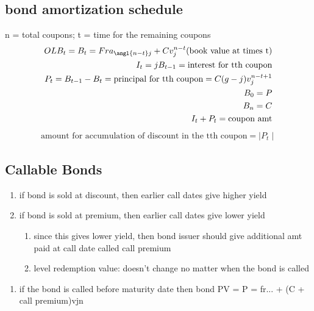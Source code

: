 \documentclass[12pt]{article}
\begin{document}
\subsection{bond amortization schedule}
n = total coupons; t = time for the remaining coupons
\begin{align}
	OLB_t = B_t = Fra_{\angl{n-t}j} + Cv^{n-t}_j \text{(book value at times t)}\nonumber \\
	I_t = jB_{t-1} = \text{interest for tth coupon} \nonumber \\
	P_t = B_{t-1} - B_t = \text{principal for tth coupon}  = C(g-j)v^{n-t+1}_j \nonumber \\
	B_0 = P \nonumber \\
	B_n = C \nonumber \\
	I_t + P_t = \text{coupon amt} \nonumber
\end{align}
\begin{align}
	\text{amount for accumulation of discount in the tth coupon} = \mid P_t \mid \nonumber
\end{align}

\subsection{Callable Bonds}
\begin{enumerate}
	\item if bond is sold at discount, then earlier call dates give higher yield
	\item if bond is sold at premium, then earlier call dates give lower yield 
	\begin{enumerate}
		\item since this gives lower yield, then bond issuer should give additional amt paid at call date called call premium
	\item level redemption value: doesn't change no matter when the bond is called 
	\end{enumerate}
\end{enumerate}
\begin{enumerate}
	\item if the bond is called before maturity date then bond PV = P = fr... + (C + call premium)vjn
\end{enumerate}
\end{document}
